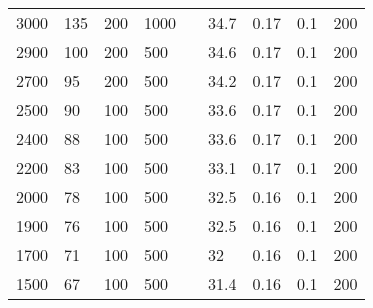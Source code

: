 \documentclass{article}
\begin{document}
\begin{table}[H]
\begin{tabular}{|l|l|l|l|l|l|l|l|l|}
        3000          & 135                       & 200                       & 1000                      &  & 34.7       & 0.17                      & 0.1                       & 200                       \\ \cline{1-4} \cline{6-9}
        2900          & 100                       & 200                       & 500                       &  & 34.6       & 0.17                      & 0.1                       & 200                       \\ \cline{1-4} \cline{6-9}
        2700          & 95                        & 200                       & 500                       &  & 34.2       & 0.17                      & 0.1                       & 200                       \\ \cline{1-4} \cline{6-9}
        2500          & 90                        & 100                       & 500                       &  & 33.6       & 0.17                      & 0.1                       & 200                       \\ \cline{1-4} \cline{6-9}
        2400          & 88                        & 100                       & 500                       &  & 33.6       & 0.17                      & 0.1                       & 200                       \\ \cline{1-4} \cline{6-9}
        2200          & 83                        & 100                       & 500                       &  & 33.1       & 0.17                      & 0.1                       & 200                       \\ \cline{1-4} \cline{6-9}
        2000          & 78                        & 100                       & 500                       &  & 32.5       & 0.16                      & 0.1                       & 200                       \\ \cline{1-4} \cline{6-9}
        1900          & 76                        & 100                       & 500                       &  & 32.5       & 0.16                      & 0.1                       & 200                       \\ \cline{1-4} \cline{6-9}
        1700          & 71                        & 100                       & 500                       &  & 32         & 0.16                      & 0.1                       & 200                       \\ \cline{1-4} \cline{6-9}
        1500          & 67                        & 100                       & 500                       &  & 31.4       & 0.16                      & 0.1                       & 200                       \\ \cline{1-4} \cline{6-9}

\end{tabular}
\end{table}
\end{document}
